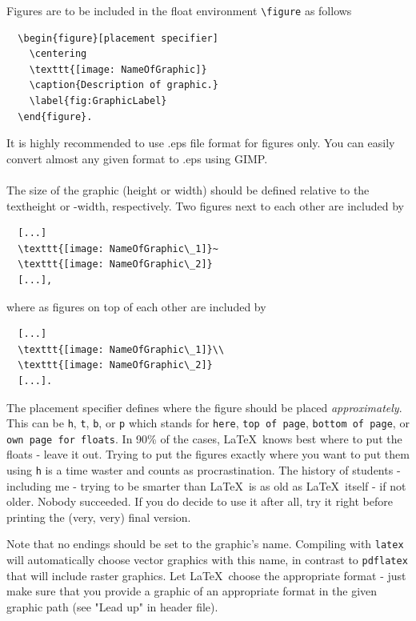 Figures are to be included in the float environment \verb!\figure! as follows

\begin{verbatim}
  \begin{figure}[placement specifier]
    \centering
    \texttt{[image: NameOfGraphic]}
    \caption{Description of graphic.}
    \label{fig:GraphicLabel}
  \end{figure}.
\end{verbatim}

It is highly recommended to use .eps file format for figures only. You can easily convert almost any given format to .eps using GIMP.\\
\linebreak\\
The size of the graphic (height or width) should be defined relative to the
textheight or -width, respectively. Two figures next to each other are
included by 

\begin{verbatim}
  [...]
  \texttt{[image: NameOfGraphic\_1]}~
  \texttt{[image: NameOfGraphic\_2]}
  [...],
\end{verbatim}
where as figures on top of each other are included by

\begin{verbatim}
  [...]
  \texttt{[image: NameOfGraphic\_1]}\\
  \texttt{[image: NameOfGraphic\_2]}
  [...].
\end{verbatim}

The placement specifier defines where the figure should be placed
\emph{approximately}. This can be \verb!h!, \verb!t!, \verb!b!, or \verb!p!
which stands for \verb!here!, \verb!top of page!, \verb!bottom of page!, or
\verb!own page for floats!. In 90\% of the cases, \LaTeX~knows best where to
put the floats - leave it out. Trying to put the figures exactly where you
want to put them using \verb!h! is a time waster and counts as
procrastination. The history of students - including me - trying to be smarter
than \LaTeX~is as old as \LaTeX~itself - if not older. Nobody succeeded. 
If you do decide to use it after all, try it right before printing the (very, very) final version.

Note that no endings should be set to the graphic's name. Compiling with
\verb!latex! will automatically choose vector graphics with this name, in
contrast to \verb!pdflatex! that will include raster graphics. Let
\LaTeX~choose the appropriate format - just make sure that you provide a
graphic of an appropriate format in the given graphic path (see "Lead up" in
header file).

